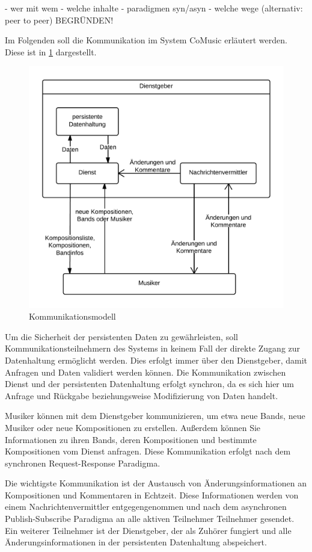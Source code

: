 \documentclass[12pt]{scrartcl}
\begin{document}
- wer mit wem
- welche inhalte
- paradigmen syn/asyn
- welche wege (alternativ: peer to peer)
BEGRÜNDEN!

Im Folgenden soll die Kommunikation im System CoMusic erläutert werden. Diese ist in \ref{fig:kommunikationsmodell} dargestellt.

\begin{figure}
\centering
\includegraphics[scale=.25]{figures/kommunikationsmodell}
\caption{Kommunikationsmodell}
\label{fig:kommunikationsmodell}
\end{figure}

Um die Sicherheit der persistenten Daten zu gewährleisten, soll Kommunikationsteilnehmern des Systems in keinem Fall der direkte Zugang zur Datenhaltung ermöglicht werden. Dies erfolgt immer über den Dienstgeber, damit Anfragen und Daten validiert werden können. Die Kommunikation zwischen Dienst und der persistenten Datenhaltung erfolgt synchron, da es sich hier um Anfrage und Rückgabe beziehungsweise Modifizierung von Daten handelt.

Musiker können mit dem Dienstgeber kommunizieren, um etwa neue Bands, neue Musiker oder neue Kompositionen zu erstellen. Außerdem können Sie Informationen zu ihren Bands, deren Kompositionen und bestimmte Kompositionen vom Dienst anfragen. Diese Kommunikation erfolgt nach dem synchronen Request-Response Paradigma.

Die wichtigste Kommunikation ist der Austausch von Änderungsinformationen an Kompositionen und Kommentaren in Echtzeit. Diese Informationen werden von einem Nachrichtenvermittler entgegengenommen und nach dem asynchronen Publish-Subscribe Paradigma an alle aktiven Teilnehmer Teilnehmer gesendet. Ein weiterer Teilnehmer ist der Dienstgeber, der als Zuhörer fungiert und alle Änderungsinformationen in der persistenten Datenhaltung abspeichert.
\end{document}
